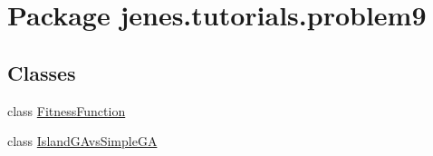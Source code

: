 \hypertarget{namespacejenes_1_1tutorials_1_1problem9}{\section{Package jenes.\-tutorials.\-problem9}
\label{namespacejenes_1_1tutorials_1_1problem9}
}
\subsection*{Classes}
\begin{DoxyCompactItemize}
\item 
class \hyperlink{classjenes_1_1tutorials_1_1problem9_1_1_fitness_function}{Fitness\-Function}
\item 
class \hyperlink{classjenes_1_1tutorials_1_1problem9_1_1_island_g_avs_simple_g_a}{Island\-G\-Avs\-Simple\-G\-A}
\end{DoxyCompactItemize}
